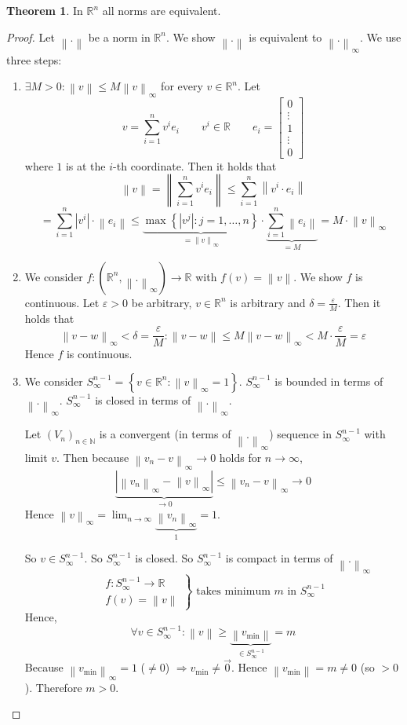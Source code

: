 \documentclass[a4paper,landscape,twocolumn]{article}
\theoremstyle{definition}
\newtheorem{theorem}{Theorem}
\newcommand\set[1]{\left\{#1\right\}}
\newcommand\abs[1]{\left|#1\right|}
\newcommand\norm[1]{\left\|#1\right\|}
\newcommand\inorm[1]{\left\|#1\right\|_\infty}
\begin{document}
\begin{theorem}
  In $\mathbb R^n$ all norms are equivalent.
\end{theorem}
\begin{proof}
  Let $\norm{.}$ be a norm in $\mathbb R^n$. We show $\norm{.}$ is equivalent to $\inorm{.}$. We use three steps:
  \begin{enumerate}
  \item $\exists M > 0: \norm{v} \leq M \inorm{v}$ for every $v \in \mathbb R^n$. Let
    \[
    v = \sum_{i=1}^n v^i e_i \qquad
    v^i \in \mathbb R \qquad
    e_i = \begin{bmatrix} 0 \\ \vdots \\ 1 \\ \vdots \\ 0 \end{bmatrix}
    \]
  where $1$ is at the $i$-th coordinate.
  Then it holds that
  \[
  \norm{v} = \norm{\sum_{i=1}^n v^i e_i} \leq \sum_{i=1}^n \norm{v^i \cdot e_i}
  \] \[
  = \sum_{i=1}^n \abs{v^i} \cdot \norm{e_i} \leq \underbrace{\max\set{\abs{v^j}: j = 1, \ldots, n}}_{= \inorm{v}} \cdot \underbrace{\sum_{i=1}^n \norm{e_i}}_{=M} = M \cdot \inorm{v}
  \]
\item We consider $f: (\mathbb R^n, \inorm{.}) \to \mathbb R$ with $f(v) = \norm{v}$.
  We show $f$ is continuous. Let $\varepsilon > 0$ be arbitrary, $v \in \mathbb R^n$ is arbitrary
  and $\delta = \frac{\varepsilon}{M}$. Then it holds that
  \[ \inorm{v - w} < \delta = \frac{\varepsilon}{M}:
  \norm{v-w} \leq M \inorm{v-w} < M \cdot \frac{\varepsilon}{M} = \varepsilon \]
  Hence $f$ is continuous.
\item We consider $S_{\infty}^{n-1} = \set{v \in \mathbb R^n: \inorm{v} = 1}$.
  $S_\infty^{n-1}$ is bounded in terms of $\inorm{.}$.
  $S_\infty^{n-1}$ is closed in terms of $\inorm{.}$.

  Let $(V_n)_{n\in\mathbb N}$ is a convergent (in terms of $\inorm{.}$) sequence in $S_{\infty}^{n-1}$ with limit $v$.
  Then because $\inorm{v_n - v} \to 0$ holds for $n \to \infty$,
  \[ \underbrace{\abs{\inorm{v_n} - \inorm{v}}}_{\to 0} \leq \inorm{v_n - v} \to 0 \]
  Hence $\inorm{v} = \lim_{n\to\infty} \underbrace{\inorm{v_n}}_{1} = 1$.

  So $v \in S_{\infty}^{n-1}$. So $S_{\infty}^{n-1}$ is closed.
  So $S_{\infty}^{n-1}$ is compact in terms of $\inorm{.}$
  \[
    \left.\begin{array}{c}
      f: S_{\infty}^{n-1} \to \mathbb R \\
      f(v) = \norm{v}
    \end{array}\right\} \text{ takes minimum $m$ in } S_{\infty}^{n-1}
  \]
  Hence,
  \[ \forall v \in S_{\infty}^{n-1}: \norm{v} \geq \underbrace{\norm{v_{\min}}}_{\in S_{\infty}^{n-1}} = m \]
  Because $\inorm{v_{\min}} = 1$ ($\neq 0$) $\Rightarrow v_{\min} \neq \vec{0}$.
  Hence $\norm{v_{\min}} = m \neq 0$ (so $>0$).
  Therefore $m > 0$.


\end{enumerate}
\end{proof}
\end{document}
